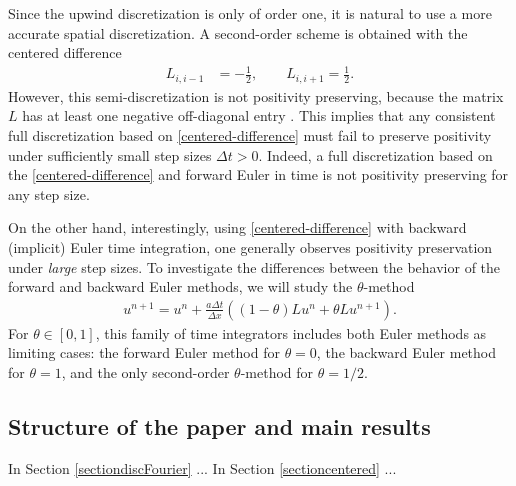 \documentclass[a4paper]{article}
\newcommand{\dt}{\Delta t}
\newcommand{\dx}{\Delta x}
\newcommand{\te}{\theta}
\begin{document}
Since the upwind discretization is only of order one, it is natural to use a more accurate spatial discretization. A second-order scheme is
obtained with the centered difference
\begin{align} \label{centered-difference}
    L_{i,i-1} & = -\frac{1}{2},\quad\quad L_{i,i+1} =  \frac{1}{2}.
\end{align}
 However, this semi-discretization is not positivity preserving, because the matrix $L$ has at least one negative off-diagonal entry \cite[Chapter I, Theorem 7.2]{hundsdorferverwer}.
This implies that any consistent full discretization based on \eqref{centered-difference}
must fail to preserve positivity under sufficiently small step sizes $\dt>0$.
Indeed, a full discretization based on the \eqref{centered-difference}
and forward Euler in time is not positivity preserving for any step size.

On the other hand, interestingly, using \eqref{centered-difference} with backward (implicit) 
Euler time integration, one generally observes positivity preservation
under \emph{large} step sizes.  To investigate the differences between the behavior
of the forward and backward Euler methods, we will study the $\theta$-method \cite[Chapter IV.3]{hairerwanner}
\begin{align}\label{firsttheta}
    u^{n+1} = u^n + \frac{a\dt}{\dx}((1-\theta)Lu^n + \theta Lu^{n+1}).
\end{align}
For $\te\in[0,1]$, this family of time integrators includes both Euler methods as limiting cases: the forward Euler method for $\te=0$, the backward 
 Euler method for $\te=1$, and the only second-order $\te$-method for $\te=1/2$. 









\subsection{Structure of the paper and main results}
In Section \ref{sectiondiscFourier} ... In Section \ref{sectioncentered} ... 
\end{document}
